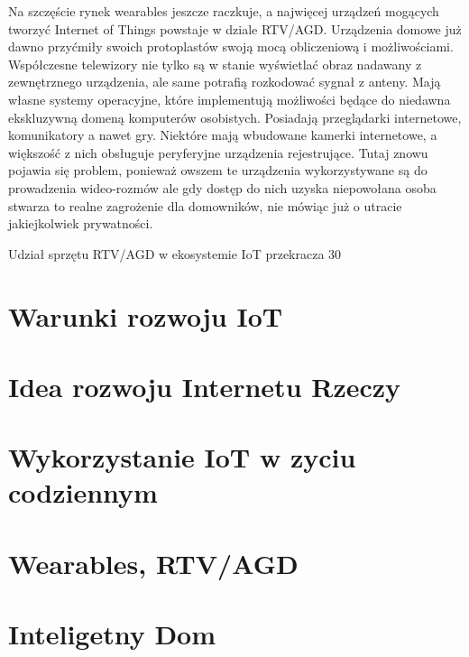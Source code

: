\documentclass[brudnopis]{xmgr}
\begin{document}
Na szczęście rynek wearables jeszcze raczkuje, a najwięcej urządzeń mogących tworzyć Internet of Things powstaje w dziale RTV/AGD. Urządzenia domowe już dawno przyćmiły swoich protoplastów swoją mocą obliczeniową i możliwościami. Współczesne telewizory nie tylko są w stanie wyświetlać obraz nadawany z zewnętrznego urządzenia, ale same potrafią rozkodować sygnał z anteny. Mają własne systemy operacyjne, które implementują możliwości będące do niedawna ekskluzywną domeną komputerów osobistych. Posiadają przeglądarki internetowe, komunikatory a nawet gry. Niektóre mają wbudowane kamerki internetowe, a większość z nich obsługuje peryferyjne urządzenia rejestrujące. Tutaj znowu pojawia się problem, ponieważ owszem te urządzenia wykorzystywane są do prowadzenia wideo-rozmów ale gdy dostęp do nich uzyska niepowołana osoba stwarza to realne zagrożenie dla domowników, nie mówiąc już o utracie jakiejkolwiek prywatności.

Udział sprzętu RTV/AGD w ekosystemie IoT przekracza 30%

\section{Warunki rozwoju IoT}



\section{Idea rozwoju Internetu Rzeczy}



\section{Wykorzystanie IoT w zyciu codziennym}


\section{Wearables, RTV/AGD}

\section{Inteligetny Dom}
\end{document}
